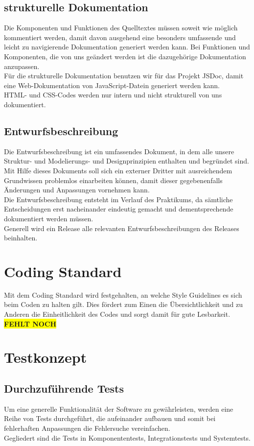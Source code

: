 \documentclass[11pt,a4paper]{report}
\begin{document}
\subsection{strukturelle Dokumentation}
Die Komponenten und Funktionen des Quelltextes müssen soweit wie möglich kommentiert werden, damit davon ausgehend eine besonders umfassende und leicht zu navigierende Dokumentation generiert werden kann.
Bei Funktionen und Komponenten, die von uns geändert werden ist die dazugehörige Dokumentation anzupassen. \\
Für die strukturelle Dokumentation benutzen wir für das Projekt JSDoc, damit eine Web-Dokumentation von JavaScript-Datein generiert werden kann.\\
HTML- und CSS-Codes werden nur intern und nicht strukturell von uns dokumentiert.
\subsection{Entwurfsbeschreibung}
Die Entwurfsbeschreibung ist ein umfassendes Dokument, in dem alle unsere Struktur- und Modelierungs- und Designprinzipien enthalten und begründet sind. Mit Hilfe dieses Dokuments soll sich ein externer Dritter mit ausreichendem Grundwissen problemlos einarbeiten können, damit dieser gegebenenfalls Änderungen und Anpassungen vornehmen kann.\\
Die Entwurfsbeschreibung entsteht im Verlauf des Praktikums, da sämtliche Entscheidungen erst nacheinander eindeutig gemacht und dementsprechende dokumentiert werden müssen.\\
Generell wird ein Release alle relevanten Entwurfsbeschreibungen des Releases beinhalten.
\section{Coding Standard}
Mit dem Coding Standard wird festgehalten, an welche Style Guidelines es sich beim Coden zu halten gilt. Dies fördert zum Einen die Übersichtlichkeit und zu Anderen die Einheitlichkeit des Codes und sorgt damit für gute Lesbarkeit.\\
\textbf{\colorbox{yellow}{FEHLT NOCH}}
\section{Testkonzept}
\subsection{Durchzuführende Tests}
Um eine generelle Funktionalität der Software zu gewährleisten, werden eine Reihe von Tests durchgeführt, die aufeinander aufbauen und somit bei fehlerhaften Anpassungen die Fehlersuche vereinfachen.\\
Gegliedert sind die Tests in Komponententests, Integrationstests und Systemtests. 
\end{document}
